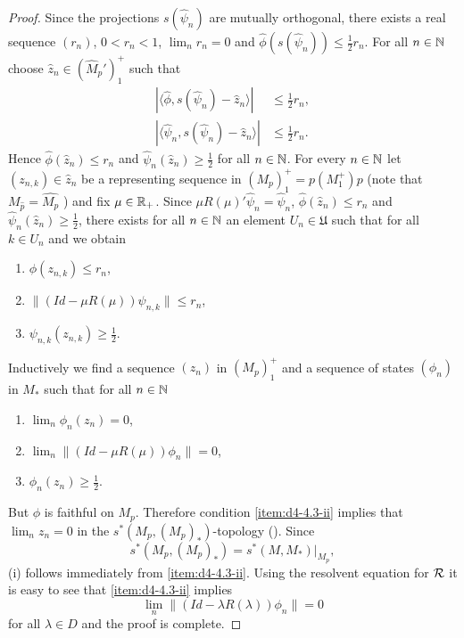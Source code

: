 \begin{proof}
Since the projections $ s(\hat{\psi}_{n}) $  are mutually orthogonal, there exists a real sequence $ (r_{n}) $, $ 0 < r_{n} < 1 $, $ \lim_{n} r_{n} = 0 $  and $ \hat{\phi}(s(\hat{\psi}_{n})) \leq \frac{1}{2}r_{n} $.
For all $ n \in \mathbb{N} $  choose $ \hat{z}_{n} \in (\widehat{M}_{p}')_{1}^{+} $  such that
\begin{align*}
|\langle\hat{\phi},s(\hat{\psi}_{n}) - \hat{z}_{n}\rangle| &\leq \frac{1}{2}r_{n}, \\
|\langle\hat{\psi}_{n},s(\hat{\psi}_{n}) - \hat{z}_{n}\rangle| &\leq \frac{1}{2}r_{n}.
\end{align*}
Hence $ \hat{\phi}(\hat{z}_{n}) \leq r_{n} $  and $ \hat{\psi}_{n}(\hat{z}_{n}) \geq \frac{1}{2} $  for all $ n \in \mathbb{N} $.
For every $ n \in \mathbb{N} $  let $ (z_{n,k}) \in \hat{z}_{n} $  be a representing sequence in $ (M_{p})_{1}^{+} = p(M_{1}^{+})p $  (note that $ {M}_{\hat{p}} = \widehat{M_{p}} $ ) and fix $ \mu \in \mathbb{R}_{+} $.
Since $ \mu R(\mu)'\hat{\psi}_{n} = \hat{\psi}_{n} $, $ \hat{\phi}(\hat{z}_{n}) \leq r_{n} $  and $ \hat{\psi}_{n}(\hat{z}_{n}) \geq \frac{1}{2} $,  there exists for all $ n \in \mathbb{N} $  an element $ U_{n} \in \mathfrak{U} $  such that for all $ k \in U_{n} $ and we obtain
\begin{enumerate}[label=(\roman*$^{\prime}$)]
\item
$ \phi(z_{n,k}) \leq r_{n} $,

\item
$ \|(Id - \mu R(\mu))\psi_{n,k}\| \leq r_{n} $,

\item
$ \psi_{n,k}(z_{n,k}) \geq \frac{1}{2} $. 
\end{enumerate}
Inductively we find a sequence $ (z_{n}) $  in $ (M_{p})_{1}^{+} $  and a sequence of states $ (\phi_{n}) $  in $ M_{*} $  such that for all $ n \in \mathbb{N} $ 
\begin{enumerate}[label=(\roman*$^{\prime\prime}$)]
\item
$ \lim_{n} \phi_{n}(z_{n}) = 0 $, 

\item%
$ \lim_{n} \|(Id - \mu R(\mu))\phi_{n}\| = 0 $, 

\item
$ \phi_{n}(z_{n}) \geq \frac{1}{2} $.
\end{enumerate}
But $ \phi $  is faithful on $ M_{p} $.
Therefore condition \ref{item:d4-4.3-ii} implies that $ \lim_{n} z_{n} = 0 $  in the $ s^{*}(M_{p},(M_{p})_{*}) $-topology (\citet[Proposition III.5.4]{takesaki:1979}).
Since 
%
\[
	s^{*}(M_{p},(M_{p})_{*}) = s^{*}(M,M_{*})|_{M_{p}} ,
\]
%
(i) follows immediately from \ref{item:d4-4.3-ii}.
Using the resolvent equation for $ \mathcal{R} $  it is easy to see that \ref{item:d4-4.3-ii} implies
\[
\lim_{n} \|(Id - \lambda R(\lambda))\phi_{n}\| = 0
\]
for all $ \lambda \in D $  and the proof is complete.
\end{proof}
